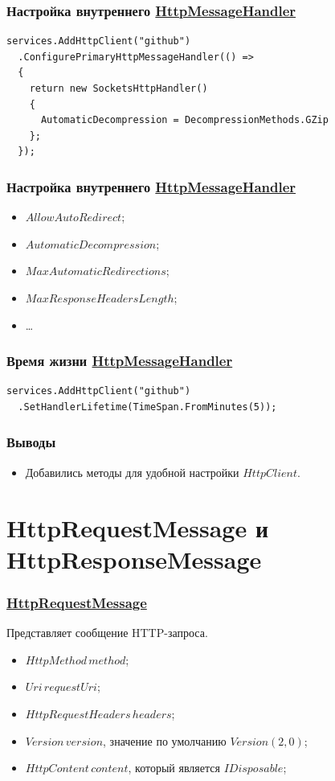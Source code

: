 \documentclass[17pt,aspectratio=169]{beamer}
\begin{document}
\begin{frame}[fragile]
\frametitle{Настройка внутреннего \href{https://docs.microsoft.com/en-us/dotnet/api/system.net.http.socketshttphandler?view=netcore-2.2}{HttpMessageHandler}}
\begin{lstlisting}
services.AddHttpClient("github")
  .ConfigurePrimaryHttpMessageHandler(() =>
  {
    return new SocketsHttpHandler()
    {
      AutomaticDecompression = DecompressionMethods.GZip
    };
  });
\end{lstlisting}
\end{frame}

\begin{frame}[fragile]
\frametitle{Настройка внутреннего \href{https://docs.microsoft.com/en-us/dotnet/api/system.net.http.socketshttphandler?view=netcore-2.2}{HttpMessageHandler}}
\begin{itemize}
	\item $AllowAutoRedirect$;
	\item $AutomaticDecompression$;
	\item $MaxAutomaticRedirections$;
	\item $MaxResponseHeadersLength$;
	\item \ldots
\end{itemize}
\end{frame}

\begin{frame}[fragile]
\frametitle{Время жизни \href{https://docs.microsoft.com/en-us/dotnet/api/system.net.http.socketshttphandler?view=netcore-2.2}{HttpMessageHandler}}
\begin{lstlisting}
services.AddHttpClient("github")
  .SetHandlerLifetime(TimeSpan.FromMinutes(5));
\end{lstlisting}
\end{frame}

\begin{frame}
\frametitle{Выводы}
\begin{itemize}
	\item Добавились методы для удобной настройки $HttpClient$.
\end{itemize}
\end{frame}


\section{HttpRequestMessage и HttpResponseMessage}
\begin{frame}
\frametitle{\href{https://docs.microsoft.com/en-us/dotnet/api/system.net.http.httprequestmessage?view=netcore-2.2}{HttpRequestMessage}}
Представляет сообщение HTTP-запроса. 
\begin{itemize}
	\item $HttpMethod\,method$;
	\item $Uri\,requestUri$;
	\item $HttpRequestHeaders\,headers$;
	\item $Version\,version$, значение по умолчанию $Version(2, 0)$;
	\item $HttpContent\,content$, который является $IDisposable$;
\end{itemize}
\end{frame}
\end{document}

